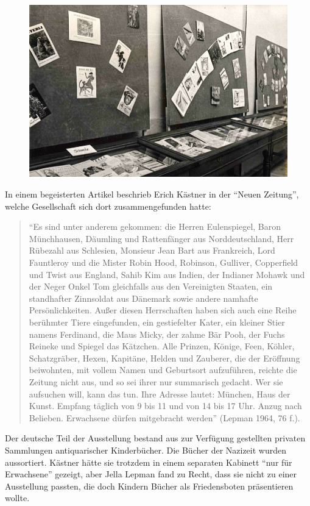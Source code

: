 \documentclass[a4paper,
fontsize=11pt,
oneside,
numbers=noperiodatend,
parskip=half-,
bibliography=totoc,
final
]{scrartcl}
\begin{document}
\begin{figure}[htbp]
\centering
\includegraphics{img/bild4.jpg}
\end{figure}

In einem begeisterten Artikel beschrieb Erich Kästner in der
\enquote{Neuen Zeitung}, welche Gesellschaft sich dort zusammengefunden
hatte:

\begin{quote}
\enquote{Es sind unter anderem gekommen: die Herren Eulenspiegel, Baron
Münchhausen, Däumling und Rattenfänger aus Norddeutschland, Herr
Rübezahl aus Schlesien, Monsieur Jean Bart aus Frankreich, Lord
Fauntleroy und die Mister Robin Hood, Robinson, Gulliver, Copperfield
und Twist aus England, Sahib Kim aus Indien, der Indianer Mohawk und der
Neger Onkel Tom gleichfalls aus den Vereinigten Staaten, ein standhafter
Zinnsoldat aus Dänemark sowie andere namhafte Persönlichkeiten. Außer
diesen Herrschaften haben sich auch eine Reihe berühmter Tiere
eingefunden, ein gestiefelter Kater, ein kleiner Stier namens Ferdinand,
die Maus Micky, der zahme Bär Pooh, der Fuchs Reineke und Spiegel das
Kätzchen. Alle Prinzen, Könige, Feen, Köhler, Schatzgräber, Hexen,
Kapitäne, Helden und Zauberer, die der Eröffnung beiwohnten, mit vollem
Namen und Geburtsort aufzuführen, reichte die Zeitung nicht aus, und so
sei ihrer nur summarisch gedacht. Wer sie aufsuchen will, kann das tun.
Ihre Adresse lautet: München, Haus der Kunst. Empfang täglich von 9 bis
11 und von 14 bis 17 Uhr. Anzug nach Belieben. Erwachsene dürfen
mitgebracht werden} (Lepman 1964, 76 f.).
\end{quote}

Der deutsche Teil der Ausstellung bestand aus zur Verfügung gestellten
privaten Sammlungen antiquarischer Kinderbücher. Die Bücher der Nazizeit
wurden aussortiert. Kästner hätte sie trotzdem in einem separaten
Kabinett \enquote{nur für Erwachsene} gezeigt, aber Jella Lepman fand zu
Recht, dass sie nicht zu einer Ausstellung passten, die doch Kindern
Bücher als Friedensboten präsentieren wollte.
\end{document}
